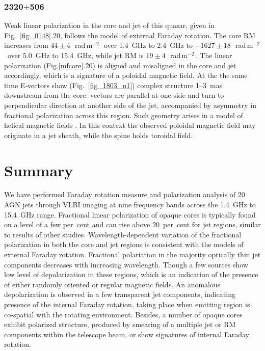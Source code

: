 \documentclass[a4paper,fleqn,usenatbib,useAMS]{mnras}
\newcommand{\rmu}{\,rad\,m$^{-2}$\,} %
\begin{document}
\subsubsection{2320$+$506}
Weak linear polarization in the core and jet of this quasar, given in Fig.~\ref{fig_0148}.20, follows the model of external Faraday rotation. 
The core RM increases from $44\pm4$~\rmu\ over 1.4~GHz to 2.4~GHz to $-1627\pm18$~\rmu\ over 5.0~GHz to 15.4~GHz, while jet RM is $19\pm4$~\rmu.
The linear polarization (Fig.\ref{mfcore}.20) is aligned and misaligned in the core and jet accordingly, which is a signature of a poloidal magnetic field. 
At the the same time E-vectors show (Fig.~\ref{fig_1803_u1}) complex structure 1--3~mas downstream from the core: vectors are parallel at one side and turn to perpendicular direction at another side of the jet, accompanied by asymmetry in fractional polarization across this region.
Such geometry arises in a model of helical magnetic fields \citep{lyutikov_etal05,2011ApJ...737...42P}.
In this context the observed poloidal magnetic field may originate in a jet sheath, while the spine holds toroidal field.



\section{Summary}
\label{sum}

We have performed Faraday rotation measure and polarization analysis of 20 AGN jets through VLBI imaging at nine frequency bands across the 1.4~GHz to 15.4~GHz range. 
Fractional linear polarization of opaque cores is typically found on a level of a few per~cent and can rise above 20~per~cent for jet regions, similar to results of other studies.
Wavelength-dependent variation of the fractional polarization in both the core and jet regions is consistent with the models of external Faraday rotation. 
Fractional polariation in the majority optically thin jet components decreases with increasing wavelength.
Though a few sources show low level of depolarization in these regions, which is an indication of the presence of either randomly oriented or regular magnetic fields.
An anomalous depolarization is observed in a few transparent jet components, indicating presence of the internal Faraday rotation, taking place when emitting region is co-spatial with the rotating environment.
Besides, a number of opaque cores exhibit polarized structure, produced by smearing of a multiple jet or RM components within the telescope beam, or show signatures of internal Faraday rotation.
\end{document}
